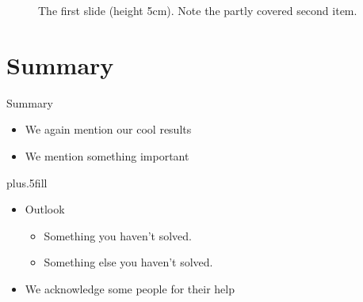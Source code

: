 \begin{figure}
  \begin{center}
  \end{center}
  \caption{The first slide (height 5cm). Note the partly covered second item.}
\end{figure}

\section*{Summary}
  \begin{frame}{Summary}
    \begin{itemize}
    \item[\cmark] We again mention our cool results
    \item We mention something important
    \end{itemize}
    
    \vskip0pt plus.5fill
    \begin{itemize}
    \item
      Outlook
      \begin{itemize}
      \item[\xmark]
        Something you haven't solved.
      \item
        Something else you haven't solved.
      \end{itemize}
    \item[\ding{43}] We acknowledge some people for their help
    \end{itemize}
  \end{frame}













































